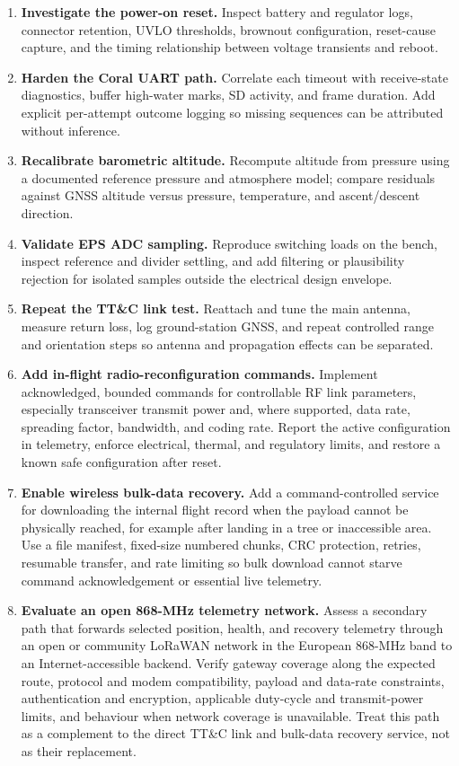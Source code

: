 \documentclass[11pt,a4paper]{article}
\begin{document}
\begin{enumerate}
  \item \textbf{Investigate the power-on reset.} Inspect battery and regulator logs, connector retention, UVLO thresholds, brownout configuration, reset-cause capture, and the timing relationship between voltage transients and reboot.
  \item \textbf{Harden the Coral UART path.} Correlate each timeout with receive-state diagnostics, buffer high-water marks, SD activity, and frame duration. Add explicit per-attempt outcome logging so missing sequences can be attributed without inference.
  \item \textbf{Recalibrate barometric altitude.} Recompute altitude from pressure using a documented reference pressure and atmosphere model; compare residuals against GNSS altitude versus pressure, temperature, and ascent/descent direction.
  \item \textbf{Validate EPS ADC sampling.} Reproduce switching loads on the bench, inspect reference and divider settling, and add filtering or plausibility rejection for isolated samples outside the electrical design envelope.
  \item \textbf{Repeat the TT\&C link test.} Reattach and tune the main antenna, measure return loss, log ground-station GNSS, and repeat controlled range and orientation steps so antenna and propagation effects can be separated.
  \item \textbf{Add in-flight radio-reconfiguration commands.} Implement acknowledged, bounded commands for controllable RF link parameters, especially transceiver transmit power and, where supported, data rate, spreading factor, bandwidth, and coding rate. Report the active configuration in telemetry, enforce electrical, thermal, and regulatory limits, and restore a known safe configuration after reset.
  \item \textbf{Enable wireless bulk-data recovery.} Add a command-controlled service for downloading the internal flight record when the payload cannot be physically reached, for example after landing in a tree or inaccessible area. Use a file manifest, fixed-size numbered chunks, CRC protection, retries, resumable transfer, and rate limiting so bulk download cannot starve command acknowledgement or essential live telemetry.
  \item \textbf{Evaluate an open 868-MHz telemetry network.} Assess a secondary path that forwards selected position, health, and recovery telemetry through an open or community LoRaWAN network in the European 868-MHz band to an Internet-accessible backend. Verify gateway coverage along the expected route, protocol and modem compatibility, payload and data-rate constraints, authentication and encryption, applicable duty-cycle and transmit-power limits, and behaviour when network coverage is unavailable. Treat this path as a complement to the direct TT\&C link and bulk-data recovery service, not as their replacement.

\end{enumerate}
\end{document}

